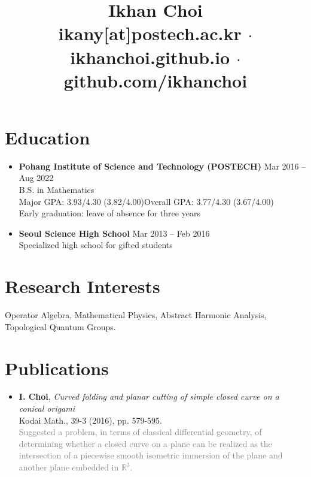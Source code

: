 \documentclass[11pt,a4paper]{article}
\title{\vspace{-40pt}
	Ikhan Choi\\[5pt]
	\small \faEnvelopeSquare\quad ikany[at]postech.ac.kr
	\quad$\cdot$\quad \faHome\quad ikhanchoi.github.io
	\quad$\cdot$\quad \faGithub\quad github.com/ikhanchoi
	\vspace{-5em}}
\date{}
\begin{document}
\maketitle


\section*{Education}
\begin{itemize}
\item
	\textbf{Pohang Institute of Science and Technology (POSTECH)}
	\hfill{\small Mar 2016 -- Aug 2022}\\
	B.S. in Mathematics\\
	Major GPA: 3.93/4.30 (3.82/4.00)\quad Overall GPA: 3.77/4.30 (3.67/4.00)\\
	Early graduation: leave of absence for three years
\item
	\textbf{Seoul Science High School}
	\hfill{\small Mar 2013 -- Feb 2016}\\
	Specialized high school for gifted students
\end{itemize}



\section*{Research Interests}
\hspace{2em}
Operator Algebra, Mathematical Physics, Abstract Harmonic Analysis, Topological Quantum Groups.



\section*{Publications}
\begin{itemize}
\item
	\textbf{I. Choi},
	\emph{Curved folding and planar cutting of simple closed curve on a conical origami}\\
	Kodai Math., 39-3 (2016), pp. 579-595.\\
	\textcolor{gray}{Suggested a problem, in terms of classical differential geometry, of determining whether a closed curve on a plane can be realized as the intersection of a piecewise smooth isometric immersion of the plane and another plane embedded in $\mathbb{R}^3$.}
\end{itemize}
\end{document}
